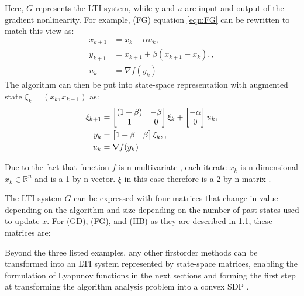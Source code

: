 Here, \(G\) represents the LTI system, while \(y\) and \(u\) are input and output of the gradient nonlinearity. For example, (FG)  equation \ref{eqn:FG} can be rewritten to match this view as:
\begin{subequations} \label{eqn:FG2}
	\begin{align}
	  x_{k+1}     &=x_k-\alpha u_k \label{eq_FGstate},       \\
	  y_{k+1} &=x_{k+1}+\beta (x_{k+1}-x_k), \label{eq_FGinterpolated point}, \\
	  u_k &= \nabla f(y_k) \label{eq_FGggradient}
	\end{align}
\end{subequations}
The algorithm can then be put into state-space representation with augmented state $\xi _k = (x_k, x_{k-1})$ as:
\begin{subequations} \label{eqn:FGss }
	\begin{align}
	  \xi_{k+1} &= \begin{bmatrix}(1+\beta) & -\beta\\ 1 & 0\end{bmatrix}\xi_k  + \begin{bmatrix}-\alpha\\ 0\end{bmatrix}u_k \label{eq_FGssstate}, \\
	  y_k &= \begin{bmatrix}1+\beta & \beta\end{bmatrix}\xi_k, \label{eq_FGssinterpolation},\\
	  u_k &= \nabla f(y_k) \label{eq_FGssgradient}
	\end{align}
\end{subequations}

 Due to the fact that function $f$ is n-multivariate , each iterate $x_k$ is n-dimensional $x_k \in \mathbb{R}^n$ and is a 1 by n vector. $\xi $ in this case therefore is a 2 by n matrix .

The LTI system \(G\) can be expressed with four matrices that change in value depending on the algorithm and size depending on the number of past states used to update \(x\). For (GD), (FG), and (HB) as they are described in  1.1, these matrices are: 

Beyond the three listed examples, any other first\comment{-}order methods can be transformed into an LTI system represented by state-space matrices, enabling the formulation of Lyapunov functions in the next sections and forming the first step at transforming the algorithm analysis problem into a convex SDP .

